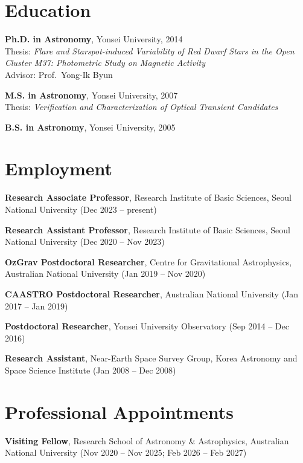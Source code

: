 \documentclass[letterpaper,11pt]{article}
\renewenvironment{itemize}{
  \begin{list}{}{
    \setlength{\leftmargin}{1.5em}
    \setlength{\itemsep}{0.2em}
    \setlength{\parsep}{0em}
  }
}{
  \end{list}
}
\begin{document}
\section*{Education}
\begin{itemize}
  \item \textbf{Ph.D. in Astronomy}, Yonsei University, 2014 \\
        Thesis: \emph{Flare and Starspot-induced Variability of Red Dwarf Stars in the
        Open Cluster M37: Photometric Study on Magnetic Activity} \\
        Advisor: Prof.\ Yong-Ik Byun
  \item \textbf{M.S. in Astronomy}, Yonsei University, 2007 \\
        Thesis: \emph{Verification and Characterization of Optical Transient Candidates}
  \item \textbf{B.S. in Astronomy}, Yonsei University, 2005
\end{itemize}

\section*{Employment}
\begin{itemize}
\item \textbf{Research Associate Professor}, Research Institute of Basic Sciences,
      Seoul National University (Dec 2023 -- present)
\item \textbf{Research Assistant Professor}, Research Institute of Basic Sciences,
      Seoul National University (Dec 2020 -- Nov 2023)
\item \textbf{OzGrav Postdoctoral Researcher}, Centre for Gravitational Astrophysics,
      Australian National University (Jan 2019 -- Nov 2020)
\item \textbf{CAASTRO Postdoctoral Researcher}, Australian National University
      (Jan 2017 -- Jan 2019)
\item \textbf{Postdoctoral Researcher}, Yonsei University Observatory (Sep 2014 -- Dec 2016)
\item \textbf{Research Assistant}, Near-Earth Space Survey Group, Korea Astronomy and
      Space Science Institute (Jan 2008 -- Dec 2008)
\end{itemize}

\section*{Professional Appointments}
\begin{itemize}
\item \textbf{Visiting Fellow}, Research School of Astronomy \& Astrophysics,
      Australian National University (Nov 2020 -- Nov 2025; Feb 2026 -- Feb 2027)
\end{itemize}
\end{document}
